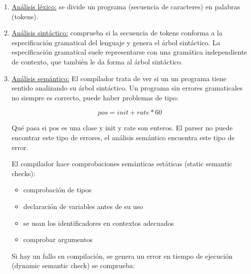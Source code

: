 \documentclass[10pt,a4paper]{report}
\begin{document}
            \begin{enumerate}
                \item \underline{Análisis léxico:} se divide un programa (secuencia de caracteres) en palabras
                    (tokens).
                
                \item \underline{Análisis sintáctico:} comprueba si la secuencia de tokens conforma a la especificación
                    gramatical del lenguaje y genera el árbol sintáctico. La especificación gramatical suele 
                    representarse con una gramática independiente de contexto, que también le da forma al árbol 
                    sintáctico.
                
                \item \underline{Análisis semántico:} El compilador trata de ver si un un programa tiene sentido 
                    analizando su árbol sintáctico. Un programa sin errores gramaticales no siempre es correcto, puede 
                    haber problemas de tipo:

                    \begin{equation}
                        pos =  init + rate * 60
                    \end{equation}
                
                    \par Qué pasa si pos es una clase y init y rate son enteros. El parser no puede encontrar este 
                        tipo de errores, el análisis semántico encuentra este tipo de error.

                    \par El compilador hace comprobaciones semánticas estáticas (static semantic checks): 
                        
                        \begin{itemize}
                            \item comprobación de tipos
                            \item declaración de variables antes de su uso
                            \item se usan los identificadores en contextos adecuados 
                            \item comprobar argumentos
                        \end{itemize}

                    \par Si hay un fallo en compilación, se genera un error en tiempo de ejecución (dynamic semantic 
                        check) se comprueba:


\end{enumerate}
\end{document}
